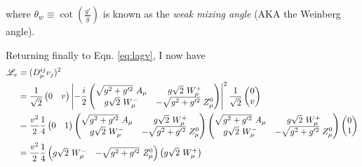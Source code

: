     where $\theta_w \equiv \cot(\frac{g'}{g})$ is known as the \textit{weak mixing angle} (AKA the Weinberg angle).

    Returning finally to Eqn. \ref{eq:lagv}, I now have
    \begin{equation} \begin{split}
        \label{eq:lagv_full}
        \Lag_v & = (D_{\mu}^{ij} v_j)^2 \\
        & = \frac{1}{\sqrt{2}} \begin{pmatrix} 0 & v \end{pmatrix}
            \left| -\frac{i}{2}
                \begin{pmatrix} 
                    \sqrt{g^2 + g^{\prime 2}}\ A_{\mu} & g \sqrt{2}\ W^+_{\mu} \\
                    g \sqrt{2}\ W^-_{\mu} & - \sqrt{g^2 + g^{\prime 2}}\ Z^0_{\mu}
                \end{pmatrix}
            \right|^2
            \frac{1}{\sqrt{2}} \begin{pmatrix} 0 \\ v \end{pmatrix} \\
        & = \frac{v^2}{2} \frac{1}{4}
            \begin{pmatrix} 0 & 1 \end{pmatrix}
            \begin{pmatrix} 
                \sqrt{g^2 + g^{\prime 2}}\ A_{\mu} & g \sqrt{2}\ W^+_{\mu} \\
                g \sqrt{2}\ W^-_{\mu} & - \sqrt{g^2 + g^{\prime 2}}\ Z^0_{\mu}
            \end{pmatrix}
            \begin{pmatrix} 
                \sqrt{g^2 + g^{\prime 2}}\ A_{\mu} & g \sqrt{2}\ W^+_{\mu} \\
                g \sqrt{2}\ W^-_{\mu} & - \sqrt{g^2 + g^{\prime 2}}\ Z^0_{\mu}
            \end{pmatrix}
            \begin{pmatrix} 0 \\ 1 \end{pmatrix} \\
        & = \frac{v^2}{2} \frac{1}{4}
            \begin{pmatrix} 
                g \sqrt{2}\ W^-_{\mu} & - \sqrt{g^2 + g^{\prime 2}}\ Z^0_{\mu}
            \end{pmatrix}
            \begin{pmatrix} 
                 g \sqrt{2}\ W^+_{\mu} \\

\end{pmatrix}
\end{split}
\end{equation}
